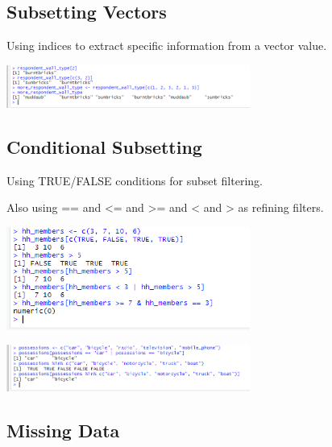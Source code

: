 \documentclass{article}
\begin{document}
\subsection{Subsetting Vectors}

Using indices to extract specific information from a vector value.

\includegraphics[width=8cm]{Images/RStudio012.PNG}

\subsection{Conditional Subsetting}

Using TRUE/FALSE conditions for subset filtering.

Also using == and <= and >= and < and > as refining filters.

\includegraphics[width=8cm]{Images/RStudio013.PNG}

\includegraphics[width=8cm]{Images/RStudio014.PNG}


\subsection{Missing Data}
\end{document}
